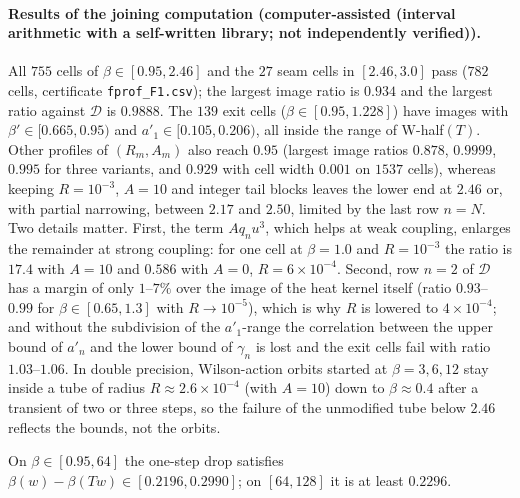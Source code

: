 \documentclass[11pt,a4paper]{article}
\theoremstyle{definition}
\theoremstyle{remark}
\newcommand{\code}[1]{\texttt{#1}}
\newcommand{\cD}{\mathcal{D}}
\newcommand{\IA}{computer-assisted (interval arithmetic with a self-written library; not independently verified)}
\begin{document}
\paragraph{Results of the joining computation (\IA).}
All $755$ cells of $\beta\in[0.95,2.46]$ and the $27$ seam cells in $[2.46,3.0]$ pass ($782$ cells, certificate \code{fprof\_F1.csv}); the largest image ratio is $0.934$ and the largest ratio against $\cD$ is $0.9888$.
The $139$ exit cells ($\beta\in[0.95,1.228]$) have images with $\beta'\in[0.665,0.95)$ and $a'_1\in[0.105,0.206)$, all inside the range of W-half$(T)$.
Other profiles of $(R_m,A_m)$ also reach $0.95$ (largest image ratios $0.878$, $0.9999$, $0.995$ for three variants, and $0.929$ with cell width $0.001$ on $1537$ cells), whereas keeping $R=10^{-3}$, $A=10$ and integer tail blocks leaves the lower end at $2.46$ or, with partial narrowing, between $2.17$ and $2.50$, limited by the last row $n=N$.
Two details matter.
First, the term $Aq_nu^3$, which helps at weak coupling, enlarges the remainder at strong coupling: for one cell at $\beta=1.0$ and $R=10^{-3}$ the ratio is $17.4$ with $A=10$ and $0.586$ with $A=0$, $R=6\times10^{-4}$.
Second, row $n=2$ of $\cD$ has a margin of only $1$--$7\%$ over the image of the heat kernel itself (ratio $0.93$--$0.99$ for $\beta\in[0.65,1.3]$ with $R\to10^{-5}$), which is why $R$ is lowered to $4\times10^{-4}$; and without the subdivision of the $a'_1$-range the correlation between the upper bound of $a'_n$ and the lower bound of $\gamma_n$ is lost and the exit cells fail with ratio $1.03$--$1.06$.
In double precision, Wilson-action orbits started at $\beta=3,6,12$ stay inside a tube of radius $R\approx2.6\times10^{-4}$ (with $A=10$) down to $\beta\approx0.4$ after a transient of two or three steps, so the failure of the unmodified tube below $2.46$ reflects the bounds, not the orbits.

On $\beta\in[0.95,64]$ the one-step drop satisfies $\beta(w)-\beta(Tw)\in[0.2196,0.2990]$; on $[64,128]$ it is at least $0.2296$.
\end{document}
